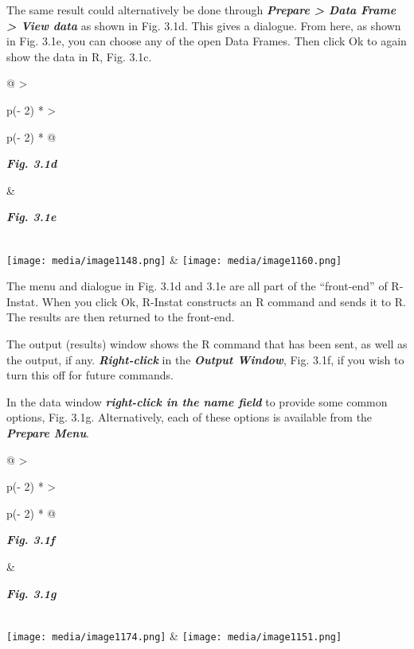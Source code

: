 \documentclass[
  letterpaper,
  DIV=11,
  numbers=noendperiod]{scrreprt}
\begin{document}
The same result could alternatively be done through
\textbf{\emph{Prepare \textgreater{} Data Frame \textgreater{} View
data}} as shown in Fig. 3.1d. This gives a dialogue. From here, as shown
in Fig. 3.1e, you can choose any of the open Data Frames. Then click Ok
to again show the data in R, Fig. 3.1c.

\begin{longtable}[]{@{}
  >{\raggedright\arraybackslash}p{(\columnwidth - 2\tabcolsep) * }
  >{\raggedright\arraybackslash}p{(\columnwidth - 2\tabcolsep) * }@{}}
\toprule\noalign{}
\begin{minipage}[b]{\linewidth}\raggedright
\textbf{\emph{Fig. 3.1d}}
\end{minipage} & \begin{minipage}[b]{\linewidth}\raggedright
\textbf{\emph{Fig. 3.1e}}
\end{minipage} \\
\midrule\noalign{}
\endhead
\bottomrule\noalign{}
\endlastfoot
\texttt{[image: media/image1148.png]}
&
\texttt{[image: media/image1160.png]} \\
\end{longtable}

The menu and dialogue in Fig. 3.1d and 3.1e are all part of the
``front-end'' of R-Instat. When you click Ok, R-Instat constructs an R
command and sends it to R. The results are then returned to the
front-end.

The output (results) window shows the R command that has been sent, as
well as the output, if any. \textbf{\emph{Right-click}} in the
\textbf{\emph{Output Window}}, Fig. 3.1f, if you wish to turn this off
for future commands.

In the data window \textbf{\emph{right-click in the name field}} to
provide some common options, Fig. 3.1g. Alternatively, each of these
options is available from the \textbf{\emph{Prepare Menu}}.

\begin{longtable}[]{@{}
  >{\raggedright\arraybackslash}p{(\columnwidth - 2\tabcolsep) * }
  >{\raggedright\arraybackslash}p{(\columnwidth - 2\tabcolsep) * }@{}}
\toprule\noalign{}
\begin{minipage}[b]{\linewidth}\raggedright
\textbf{\emph{Fig. 3.1f}}
\end{minipage} & \begin{minipage}[b]{\linewidth}\raggedright
\textbf{\emph{Fig. 3.1g}}
\end{minipage} \\
\midrule\noalign{}
\endhead
\bottomrule\noalign{}
\endlastfoot
\texttt{[image: media/image1174.png]}
&
\texttt{[image: media/image1151.png]} \\
\end{longtable}
\end{document}
